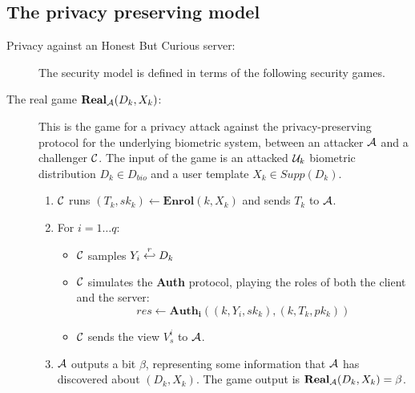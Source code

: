 \subsection{The privacy preserving model}
\begin{description}
\item[Privacy against an Honest But Curious server:] The security model is defined in terms of the following security games.

\item[The real game $\mathbf{Real}_{\mathcal{A}}(D_k,X_k)$:] This is the game for a privacy attack against the
  privacy-preserving protocol for the underlying biometric system, between an attacker $\mathcal{A}$ and a challenger
  $\mathcal{C}$. The input of the game is an attacked $\mathcal{U}_k$ biometric distribution $D_k \in D_{bio}$ and a user
  template $X_k \in Supp(D_k)$.
  \begin{enumerate} %
  \item $\mathcal{C}$ runs $(T_k, sk_k) \gets \mathbf{Enrol}(k,X_k)$ and sends $T_k$ to $\mathcal{A}$.
  \item For $i = 1 \dots q$:
    \begin{itemize}
    \item $\mathcal{C}$ samples \(Y_{i} \stackrel{r}{\hookleftarrow} D_{k}\)
    \item $\mathcal{C}$ simulates the \textbf{Auth} protocol, playing the roles of both the client and the server:
      \[
        res \gets \mathbf{Auth_i}((k, Y_i, sk_k), (k, T_k, pk_k))
      \]
    \item $\mathcal{C}$ sends the view $V_s^{i}$ to $\mathcal{A}$.
    \end{itemize}
  \item $\mathcal{A}$ outputs a bit $\beta$, representing some information that $\mathcal{A}$ has discovered about
    $(D_k,X_k)$. The game output is $\mathbf{Real}_{\mathcal{A}}(D_k,X_k) = \beta$.
  \end{enumerate}


\end{description}
